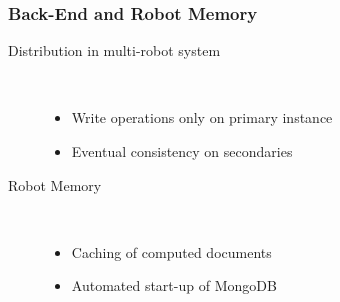 \begin{frame}
  \frametitle{Back-End and Robot Memory}
  \begin{description}
  \item[Distribution in multi-robot system]
                \hfill \\
    \begin{itemize}
    \item Write operations only on primary instance
    \item Eventual consistency on secondaries %
    \end{itemize}
\bigskip
  \item[Robot Memory]
                \hfill \\
    \begin{itemize}
    \item Caching of computed documents
    \item Automated start-up of MongoDB
    \end{itemize}
  \end{description}
\end{frame}


